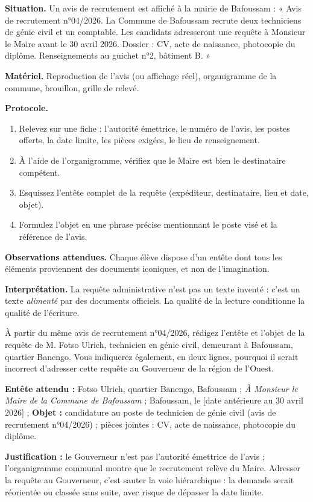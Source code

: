 \documentclass[11pt]{article}
\begin{document}
\begin{experience}
\textbf{Situation.} Un avis de recrutement est affiché à la mairie de Bafoussam : « Avis de recrutement n°04/2026. La Commune de Bafoussam recrute deux techniciens de génie civil et un comptable. Les candidats adresseront une requête à Monsieur le Maire avant le 30 avril 2026. Dossier : CV, acte de naissance, photocopie du diplôme. Renseignements au guichet n°2, bâtiment B. »

\textbf{Matériel.} Reproduction de l'avis (ou affichage réel), organigramme de la commune, brouillon, grille de relevé.

\textbf{Protocole.}
\begin{enumerate}
\item Relevez sur une fiche : l'autorité émettrice, le numéro de l'avis, les postes offerts, la date limite, les pièces exigées, le lieu de renseignement.
\item À l'aide de l'organigramme, vérifiez que le Maire est bien le destinataire compétent.
\item Esquissez l'entête complet de la requête (expéditeur, destinataire, lieu et date, objet).
\item Formulez l'objet en une phrase précise mentionnant le poste visé et la référence de l'avis.
\end{enumerate}

\textbf{Observations attendues.} Chaque élève dispose d'un entête dont tous les éléments proviennent des documents iconiques, et non de l'imagination.

\textbf{Interprétation.} La requête administrative n'est pas un texte inventé : c'est un texte \emph{alimenté} par des documents officiels. La qualité de la lecture conditionne la qualité de l'écriture.
\end{experience}

\begin{exercice}
À partir du même avis de recrutement n°04/2026, rédigez l'entête et l'objet de la requête de M. Fotso Ulrich, technicien en génie civil, demeurant à Bafoussam, quartier Banengo. Vous indiquerez également, en deux lignes, pourquoi il serait incorrect d'adresser cette requête au Gouverneur de la région de l'Ouest.
\end{exercice}

\begin{corrige}[Exercice]
\textbf{Entête attendu :} Fotso Ulrich, quartier Banengo, Bafoussam ; \emph{À Monsieur le Maire de la Commune de Bafoussam} ; Bafoussam, le [date antérieure au 30 avril 2026] ; \textbf{Objet :} candidature au poste de technicien de génie civil (avis de recrutement n°04/2026) ; pièces jointes : CV, acte de naissance, photocopie du diplôme.

\textbf{Justification :} le Gouverneur n'est pas l'autorité émettrice de l'avis ; l'organigramme communal montre que le recrutement relève du Maire. Adresser la requête au Gouverneur, c'est sauter la voie hiérarchique : la demande serait réorientée ou classée sans suite, avec risque de dépasser la date limite.
\end{corrige}
\end{document}
